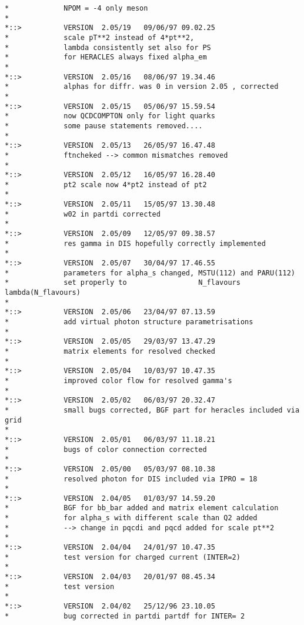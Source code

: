 \documentclass[10pt]{article} \usepackage{dina4}
\begin{document}
\begin{verbatim}
*             NPOM = -4 only meson
*
*::>          VERSION  2.05/19   09/06/97 09.02.25
*             scale pT**2 instead of 4*pt**2,
*             lambda consistently set also for PS
*             for HERACLES always fixed alpha_em
*
*::>          VERSION  2.05/16   08/06/97 19.34.46
*             alphas for diffr. was 0 in version 2.05 , corrected
*
*::>          VERSION  2.05/15   05/06/97 15.59.54
*             now QCDCOMPTON only for light quarks
*             some pause statements removed....
*
*::>          VERSION  2.05/13   26/05/97 16.47.48
*             ftncheked --> common mismatches removed
*
*::>          VERSION  2.05/12   16/05/97 16.28.40
*             pt2 scale now 4*pt2 instead of pt2
*
*::>          VERSION  2.05/11   15/05/97 13.30.48
*             w02 in partdi corrected
*
*::>          VERSION  2.05/09   12/05/97 09.38.57
*             res gamma in DIS hopefully correctly implemented
*
*::>          VERSION  2.05/07   30/04/97 17.46.55
*             parameters for alpha_s changed, MSTU(112) and PARU(112)
*             set properly to                 N_flavours    lambda(N_flavours)
*
*::>          VERSION  2.05/06   23/04/97 07.13.59
*             add virtual photon structure parametrisations
*
*::>          VERSION  2.05/05   29/03/97 13.47.29
*             matrix elements for resolved checked
*
*::>          VERSION  2.05/04   10/03/97 10.47.35
*             improved color flow for resolved gamma's
*
*::>          VERSION  2.05/02   06/03/97 20.32.47
*             small bugs corrected, BGF part for heracles included via grid
*
*::>          VERSION  2.05/01   06/03/97 11.18.21
*             bugs of color connection corrected
*
*::>          VERSION  2.05/00   05/03/97 08.10.38
*             resolved photon for DIS included via IPRO = 18
*
*::>          VERSION  2.04/05   01/03/97 14.59.20
*             BGF for bb_bar added and matrix element calculation
*             for alpha_s with different scale than Q2 added
*             --> change in pqcdi and pqcd added for scale pt**2
*
*::>          VERSION  2.04/04   24/01/97 10.47.35
*             test version for charged current (INTER=2)
*
*::>          VERSION  2.04/03   20/01/97 08.45.34
*             test version
*
*::>          VERSION  2.04/02   25/12/96 23.10.05
*             bug corrected in partdi partdf for INTER= 2


\end{verbatim}
\end{document}
